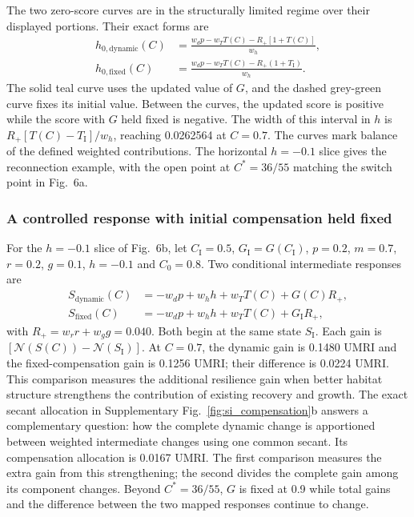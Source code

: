 The two zero-score curves are in the structurally limited regime over their displayed portions. Their exact forms are
\[
\begin{aligned}
h_{0,\mathrm{dynamic}}(C)&=\frac{w_dp-w_TT(C)-R_+[1+T(C)]}{w_h},\\
h_{0,\mathrm{fixed}}(C)&=\frac{w_dp-w_TT(C)-R_+(1+T_{\mathrm I})}{w_h}.
\end{aligned}
\]
The solid teal curve uses the updated value of $G$, and the dashed grey-green curve fixes its initial value. Between the curves, the updated score is positive while the score with $G$ held fixed is negative. The width of this interval in $h$ is $R_+[T(C)-T_{\mathrm I}]/w_h$, reaching 0.0262564 at $C=0.7$. The curves mark balance of the defined weighted contributions. The horizontal $h=-0.1$ slice gives the reconnection example, with the open point at $C^*=36/55$ matching the switch point in Fig.~6a.

\subsubsection{A controlled response with initial compensation held fixed}
For the $h=-0.1$ slice of Fig.~6b, let $C_{\mathrm I}=0.5$, $G_{\mathrm I}=G(C_{\mathrm I})$, $p=0.2$, $m=0.7$, $r=0.2$, $g=0.1$, $h=-0.1$ and $C_0=0.8$. Two conditional intermediate responses are
\[
\begin{aligned}
S_{\mathrm{dynamic}}(C)&=-w_dp+w_hh+w_TT(C)+G(C)R_+,\\
S_{\mathrm{fixed}}(C)&=-w_dp+w_hh+w_TT(C)+G_{\mathrm I}R_+,
\end{aligned}
\]
with $R_+=w_rr+w_gg=0.040$. Both begin at the same state $S_{\mathrm I}$. Each gain is $[\mathcal{N}(S(C))-\mathcal{N}(S_{\mathrm I})]$. At $C=0.7$, the dynamic gain is 0.1480 UMRI and the fixed-compensation gain is 0.1256 UMRI; their difference is 0.0224 UMRI. This comparison measures the additional resilience gain when better habitat structure strengthens the contribution of existing recovery and growth. The exact secant allocation in Supplementary Fig.~\ref{fig:si_compensation}b answers a complementary question: how the complete dynamic change is apportioned between weighted intermediate changes using one common secant. Its compensation allocation is 0.0167 UMRI. The first comparison measures the extra gain from this strengthening; the second divides the complete gain among its component changes. Beyond $C^*=36/55$, $G$ is fixed at 0.9 while total gains and the difference between the two mapped responses continue to change.

